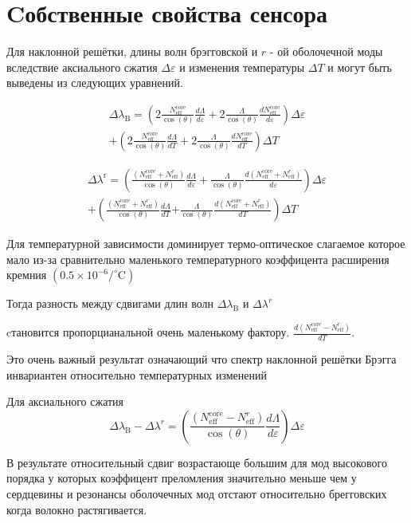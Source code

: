 
\section{Cобственные свойства сенсора}

Для наклонной решётки, длины волн брэгговской и $ r $ - ой оболочечной моды
вследствие аксиального сжатия $ \Delta \varepsilon $ и изменения температуры $ \Delta T $ и могут быть выведены из следующих уравнений.



$$
\begin{aligned}
\Delta \lambda_{\mathrm{B}}=\left(2 \frac{N_{\mathrm{eff}}^{\mathrm{core}}}{\cos (\theta)} \frac{d \Lambda}{d \varepsilon}+2 \frac{\Lambda}{\cos (\theta)} \frac{d N_{\mathrm{eff}}^{\mathrm{core}}}{d \varepsilon}\right) \Delta \varepsilon \\
+\left(2 \frac{N_{\mathrm{eff}}^{\mathrm{core}}}{\cos (\theta)} \frac{d \Lambda}{d T}+2 \frac{\Lambda}{\cos (\theta)} \frac{d N_{\mathrm{eff}}^{\mathrm{core}}}{d T}\right) \Delta T 
\end{aligned}
$$



$$
\begin{aligned}
\Delta
 \lambda^{\mathrm{r}}=\left(\frac{\left(N_{\mathrm{eff}}^{\mathrm{core}}+N_{\mathrm{eff}}^{r}\right)}{\cos (\theta)} \frac{d \Lambda}{d \varepsilon}+\frac{\Lambda}{\cos (\theta)} \frac{d\left(N_{\mathrm{eff}}^{\mathrm{core}}+N_{\mathrm{eff}}^{r}\right)}{d \varepsilon}\right) \Delta \varepsilon  \\
+\left(\frac{\left(N_{\mathrm{eff}}^{\mathrm{core}}+N_{\mathrm{eff}}^{r}\right)}{\cos (\theta)} \frac{d \Lambda}{d T}\right.
\left.+\frac{\Lambda}{\cos (\theta)} \frac{d\left(N_{\mathrm{eff}}^{\mathrm{core}}+N_{\mathrm{eff}}^{r}\right)}{d T}\right) \Delta T
\end{aligned}
$$

Для температурной зависимости доминирует термо-оптическое слагаемое которое мало из-за сравнительно маленького температурного коэффицента расширения кремния $\left(0.5 \times 10^{-6} /^{\circ} \mathrm{C}\right)$


Тогда разность между сдвигами длин волн $\Delta \lambda_{\mathrm{B}}$  и $\Delta \lambda^{r}$

cтановится пропорцианальной очень маленькому фактору. $\frac{d\left(N_{\mathrm{eff}}^{\mathrm{core}}-N_{\mathrm{eff}}^{r}\right)}{ d T}$.

Это очень важный результат означающий что спектр наклонной решётки Брэгга инвариантен относительно температурных изменений


Для аксиального сжатия
\begin{equation}\Delta \lambda_{\mathrm{B}}-\Delta \lambda^{r}=\left(\frac{\left(N_{\mathrm{eff}}^{\mathrm{core}}-N_{\mathrm{eff}}^{r}\right)}{\cos (\theta)} \frac{d \Lambda}{d \varepsilon}\right) \Delta \varepsilon\end{equation}


В результате относительный сдвиг возрастающе большим для мод высокового порядка у которых коэффицент преломления значительно меньше чем у сердцевины и резонансы оболочечных мод отстают относительно брегговских когда волокно растягивается.
